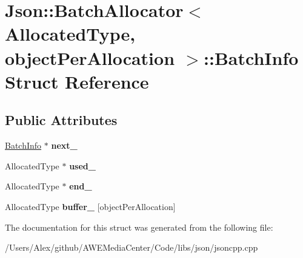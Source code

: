 \hypertarget{struct_json_1_1_batch_allocator_1_1_batch_info}{\section{Json\-:\-:Batch\-Allocator$<$ Allocated\-Type, object\-Per\-Allocation $>$\-:\-:Batch\-Info Struct Reference}
\label{struct_json_1_1_batch_allocator_1_1_batch_info}
}
\subsection*{Public Attributes}
\begin{DoxyCompactItemize}
\item 
\hypertarget{struct_json_1_1_batch_allocator_1_1_batch_info_acc4f49589b6df51db1a67bf2ee2d336a}{\hyperlink{struct_json_1_1_batch_allocator_1_1_batch_info}{Batch\-Info} $\ast$ {\bfseries next\-\_\-}}\label{struct_json_1_1_batch_allocator_1_1_batch_info_acc4f49589b6df51db1a67bf2ee2d336a}

\item 
\hypertarget{struct_json_1_1_batch_allocator_1_1_batch_info_a61f1740851eda82927a3d434179414b0}{Allocated\-Type $\ast$ {\bfseries used\-\_\-}}\label{struct_json_1_1_batch_allocator_1_1_batch_info_a61f1740851eda82927a3d434179414b0}

\item 
\hypertarget{struct_json_1_1_batch_allocator_1_1_batch_info_a3ae3cfb3e7474cc562929b515dba8453}{Allocated\-Type $\ast$ {\bfseries end\-\_\-}}\label{struct_json_1_1_batch_allocator_1_1_batch_info_a3ae3cfb3e7474cc562929b515dba8453}

\item 
\hypertarget{struct_json_1_1_batch_allocator_1_1_batch_info_a206b15040f6f036303d49f05fe0fed21}{Allocated\-Type {\bfseries buffer\-\_\-} \mbox{[}object\-Per\-Allocation\mbox{]}}\label{struct_json_1_1_batch_allocator_1_1_batch_info_a206b15040f6f036303d49f05fe0fed21}

\end{DoxyCompactItemize}


The documentation for this struct was generated from the following file\-:\begin{DoxyCompactItemize}
\item 
/\-Users/\-Alex/github/\-A\-W\-E\-Media\-Center/\-Code/libs/json/jsoncpp.\-cpp\end{DoxyCompactItemize}
